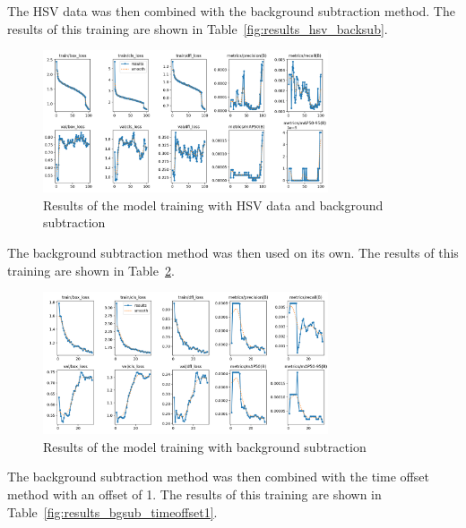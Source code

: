 
The HSV data was then combined with the background subtraction method. The results of this training are shown in Table~\ref{fig:results_hsv_backsub}.

\begin{figure}[htbp] 
    \centering
    \includegraphics[width=0.75\textwidth]{images/results/hsv_bgsub_results.png}
    \caption{Results of the model training with HSV data and background subtraction}
    \label{fig:results_hsv_bgsub}
\end{figure}



The background subtraction method was then used on its own. The results of this training are shown in Table~\ref{fig:results_bgsub}.

\begin{figure}[htbp] 
    \centering
    \includegraphics[width=0.75\textwidth]{images/results/bgsub_results.png}
    \caption{Results of the model training with background subtraction}
    \label{fig:results_bgsub}
\end{figure}



The background subtraction method was then combined with the time offset method with an offset of 1. The results of this training are shown in Table~\ref{fig:results_bgsub_timeoffset1}.

